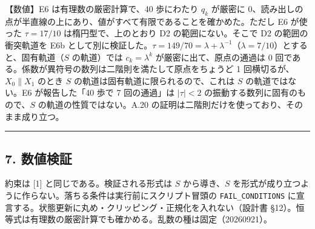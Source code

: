 \documentclass[
  a4paper,
]{ltjsarticle}
\begin{document}
【数値】E6 は有理数の厳密計算で、40 歩にわたり \(q_k\) が厳密に
0、読み出しの点が半直線の上にあり、値がすべて有限であることを確かめた。ただし
E6 が使った \(\tau=17/10\) は楕円型で、上のとおり D2
の範囲にない。そこで D2 の範囲の衝突軌道を E6b
として別に検証した。\(\tau=149/70=\lambda+\lambda^{-1}\)（\(\lambda=7/10\)）とすると、固有軌道（\(S\)
の軌道）では \(c_k=\lambda^k\) が厳密に出て、原点の通過は 0
回である。係数が異符号の数列は二階則を満たして原点をちょうど 1
回横切るが、\(X_0\parallel X_1\) のとき \(S\)
の軌道は固有軌道に限られるので、これは \(S\) の軌道ではない。E6
が報告した「40 歩で 7 回の通過」は \(\lvert\tau\rvert<2\)
の振動する数列に固有のもので、\(S\) の軌道の性質ではない。A.20
の証明は二階則だけを使っており、そのまま成り立つ。

\begin{center}\rule{0.5\linewidth}{0.5pt}\end{center}

\subsection{7. 数値検証}\label{ux6570ux5024ux691cux8a3c}

約束は {[}1{]} と同じである。検証される形式は \(S\) から導き、\(S\)
を形式が成り立つように作らない。落ちる条件は実行前にスクリプト冒頭の
\texttt{FAIL\_CONDITIONS}
に宣言する。状態更新に丸め・クリッピング・正規化を入れない（設計書
§12）。恒等式は有理数の厳密計算でも確かめる。乱数の種は固定（20260921）。
\end{document}

